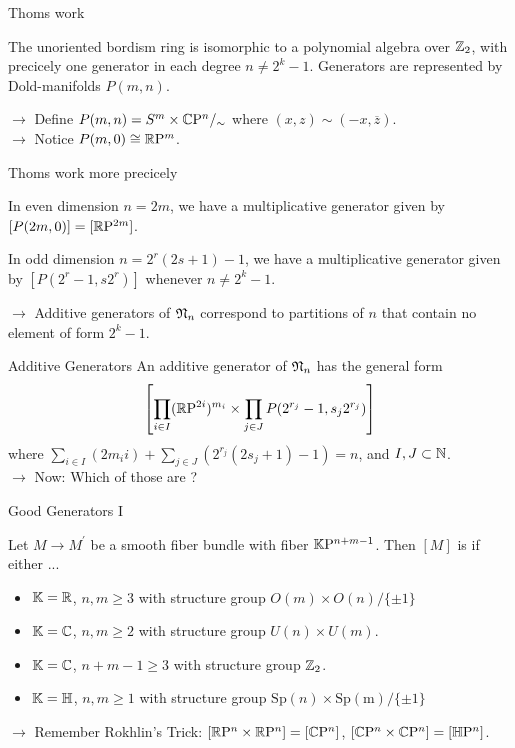 \documentclass{presis}
\begin{document}
\begin{frame}{Thoms work}
    \begin{thm}
        The unoriented bordism ring is isomorphic to a polynomial algebra over $\mathbb{Z}_2$, with precicely one generator in each degree $n\neq 2^k - 1$.
        Generators are represented by Dold-manifolds $P(m,n)$.
    \end{thm}\pause
    $\rightarrow$ Define $P(m,n) = S^m\times\mathbb{C}\mathrm{P}^n /_\sim$ where $(x,z)\sim (-x,\overline{z})$.\pause \\
    $\rightarrow$ Notice $P(m,0) \cong \mathbb{R}\mathrm{P}^m$.
\end{frame}

\begin{frame}{Thoms work more precicely}
    \begin{vfilleditems}
    \item In even dimension $n = 2m$, we have a multiplicative generator given by $[P(2m,0)] = [\mathbb{R}\mathrm{P}^{2m}]$.\pause
    \item In odd dimension $n = 2^r(2s + 1) - 1$, we have a multiplicative generator given by $[P(2^r - 1, s2^r)]$ whenever $n\neq 2^k - 1$.\pause
    \end{vfilleditems}
    $\rightarrow$ Additive generators of $\mathfrak{N}_n$ correspond to partitions of $n$ that contain no element of form $2^k - 1$.
\end{frame}

\begin{frame}{Additive Generators}
    An additive generator of $\mathfrak{N}_n$ has the general form
    \begin{equation*}
        \left[ \prod\limits_{i\in I} (\mathbb{R}\mathrm{P}^{2i})^{m_i} \times \prod\limits_{j\in J} P(2^{r_j} - 1, s_j 2^{r_j}) \right]
    \end{equation*}
    where $\sum_{i\in I} (2 m_i i) + \sum_{j\in J} (2^{r_j}(2 s_j + 1) - 1) = n$, and $I,J\subset\mathbb{N}$.\\\vspace{\baselineskip} \pause
    $\rightarrow$ Now: Which of those are \good ?
\end{frame}

\begin{frame}{Good Generators I}
\begin{lem}
    Let $M \to M^\prime$ be a smooth fiber bundle with fiber $\mathbb{K}\mathrm{P}^{n + m - 1}$. Then $[M]$ is \good{} if either ...
    \begin{itemize}
        \item $\mathbb{K} = \mathbb{R}$, $n,m\geq 3$ with structure group $O(m)\times O(n) / \{\pm 1\}$
        \item $\mathbb{K} = \mathbb{C}$, $n,m \geq 2$ with structure group $U(n)\times U(m)$.
        \item $\mathbb{K} = \mathbb{C}$, $n + m -1 \geq 3$ with structure group $\mathbb{Z}_2$.
        \item $\mathbb{K} = \mathbb{H}$, $n,m\geq 1$ with structure group $\mathrm{Sp}(n)\times\mathrm{Sp(m)}/\{\pm 1\}$
    \end{itemize}
\end{lem}\pause
    $\rightarrow$ Remember Rokhlin's Trick: $[\mathbb{R}\mathrm{P}^n\times\mathbb{R}\mathrm{P}^n] = [\mathbb{C}\mathrm{P}^n]$, $[\mathbb{C}\mathrm{P}^n\times\mathbb{C}\mathrm{P}^n] = [\mathbb{H}\mathrm{P}^n]$.
\end{frame}
\end{document}
